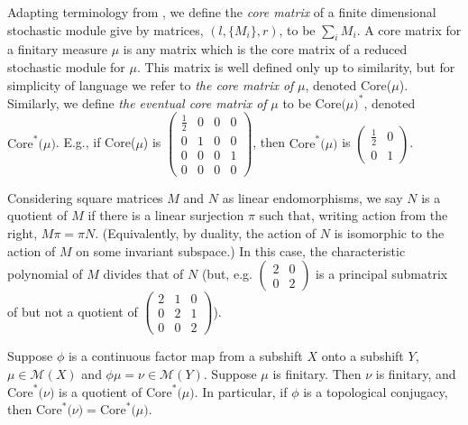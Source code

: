 \documentclass{kepart2010}
\theoremstyle{plain}
\theoremstyle{definition}
\theoremstyle{remark}
\theoremstyle{definition}
\numberwithin{equation}{section}
\begin{document}
Adapting terminology from \cite{Nasu1985}, we define the {\it core
matrix} of a finite dimensional stochastic module give by matrices,
$(l,\{M_i\},r)$, to be $\sum_i M_i$. A core matrix for a finitary
measure $\mu$ is any matrix which is the  core matrix of a reduced
stochastic module for $\mu$. This matrix is well defined only up to
similarity, but for simplicity of language we refer to {\it the core
matrix of} $\mu$, denoted Core($\mu$). Similarly, we define {\it the
eventual core matrix of} $\mu$ to be $\text{Core(}\mu\text{)}^*$,
denoted  $\text{Core}^*\text{(}\mu\text{)}$. E.g., if Core($\mu$) is
$\begin{pmatrix}
\frac 12 & 0 & 0 & 0 \\
0 & 1 & 0& 0 \\
0&0&0&1 \\
0&0&0&0
\end{pmatrix}
$,
then
$\text{Core}^*\text{(}\mu\text{)}$
is
$\begin{pmatrix}
\frac 12 & 0  \\
0 & 1
\end{pmatrix}
$.

Considering  square matrices $M$ and $N$ as linear
endomorphisms, we say $N$ is a quotient of $M$ if
there is a linear surjection $\pi$ such that,
writing action from the right, $M \pi = \pi N$.
(Equivalently, by duality, the action of $N$ is isomorphic
to the action of $M$ on some invariant subspace.)
 In this case, the characteristic polynomial of $M$
divides that of $N$ (but,  e.g.
$\begin{pmatrix}
2&0  \\
0&2
\end{pmatrix}
$
 is a principal submatrix of but not a quotient of
$\begin{pmatrix}
2&1&0  \\
0&2&1 \\
0&0&2
\end{pmatrix}
$).

\begin{thm} \label{coretheorem}
Suppose $\phi$ is a continuous factor map from a subshift $X$ onto a
subshift $Y$, $\mu \in \mathcal M(X)$ and $\phi \mu=\nu \in \mathcal
M(Y)$. Suppose $\mu$ is finitary.
 Then $\nu $ is finitary, and
$\text{Core}^*\text{(}\nu\text{)}$ is a quotient of
$\text{Core}^*\text{(}\mu\text{)}$. In particular, if $\phi$ is a
topological conjugacy, then $\text{Core}^*\text{(}\nu\text{)} =
\text{Core}^*\text{(}\mu\text{)} $.
\end{thm}
\end{document}
